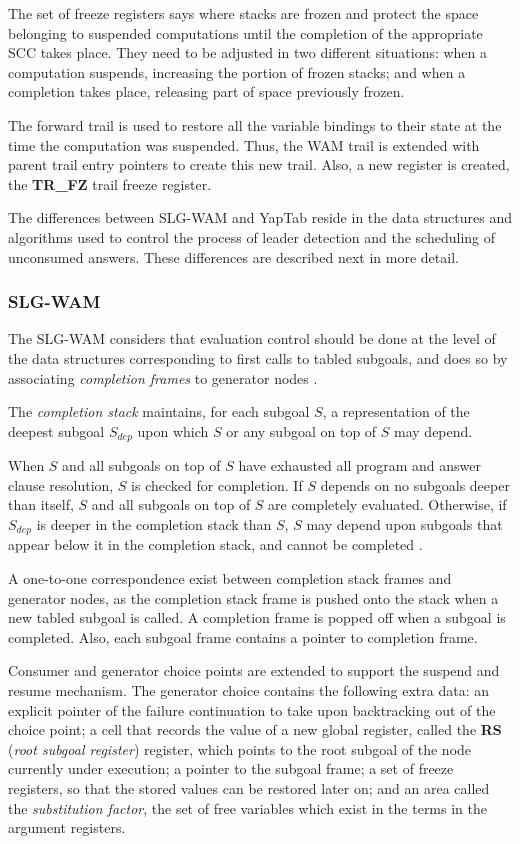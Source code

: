   The set of freeze registers says where stacks are frozen and protect the space belonging to suspended
  computations until the completion of the appropriate SCC takes place. They need to be adjusted
  in two different situations: when a computation suspends, increasing the portion of frozen stacks; and when a completion takes place,
  releasing part of space previously frozen.

  The forward trail is used to restore all the variable bindings to their state at the time the computation was suspended.
  Thus, the WAM trail is extended with parent trail entry pointers to create this new trail.
  Also, a new register is created, the \textbf{TR\_FZ} trail freeze register.

  The differences between SLG-WAM and YapTab reside in the data structures and algorithms used to control the process of leader detection
  and the scheduling of unconsumed answers. These differences are described next in more detail.
  
  \subsubsection{SLG-WAM}

  The SLG-WAM considers that evaluation control should be done at the level of the data structures
  corresponding to first calls to tabled subgoals, and does so by associating \textit{completion frames}
  to generator nodes \cite{Sagonas-98}.

  The \textit{completion stack} maintains, for each subgoal $S$, a representation of the deepest subgoal
  $S_{dep}$ upon which $S$ or any subgoal on top of $S$ may depend.

  When $S$ and all subgoals on top of $S$ have exhausted all program and answer clause resolution,
  $S$ is checked for completion. If $S$ depends on no subgoals deeper than itself, $S$ and
  all subgoals on top of $S$ are completely evaluated. Otherwise, if $S_{dep}$ is deeper in the completion
  stack than $S$, $S$ may depend upon subgoals that appear below it in the completion stack, and cannot be completed \cite{Sagonas-98}.

  A one-to-one correspondence exist between completion stack frames and generator nodes, as the completion stack frame
  is pushed onto the stack when a new tabled subgoal is called. A completion frame is popped off when a subgoal is
  completed. Also, each subgoal frame contains a pointer to completion frame.

  Consumer and generator choice points are extended to support the suspend and resume mechanism.
  The generator choice contains the following extra data: an explicit pointer of the failure continuation to take
  upon backtracking out of the choice point; a cell that records the value of a new global register,
  called the \textbf{RS} (\textit{root subgoal register}) register,
  which points to the root subgoal of the node currently under execution;
  a pointer to the subgoal frame; a set of freeze registers, so that the stored values can be restored later on;
  and an area called the \textit{substitution factor}, the set of free variables which exist in the terms in the argument registers.

